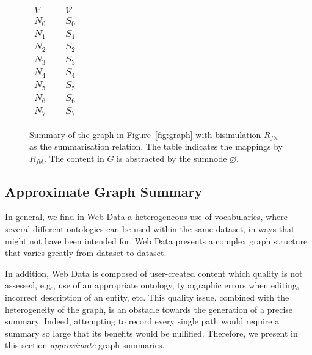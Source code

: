 \begin{figure}
	\centering
	\begin{minipage}{.75\textwidth}
		\resizebox{\textwidth}{!}{
			
		}
	\end{minipage}
	\quad
	\begin{minipage}[h]{.2\textwidth}
		\centering
		\caption*{$R_{fbt}\left(V, \mathcal{V}\right)$}
		\begin{tabular}{lc@{\hs}l}
			\toprule
			$V$ & \phantom{a} & $\mathcal{V}$ \\
			\cmidrule{1-1} \cmidrule{3-3}
			$N_0$ & \phantom{a} & $S_0$ \\
			$N_1$ & \phantom{a} & $S_1$ \\
			$N_2$ & \phantom{a} & $S_2$ \\
			$N_3$ & \phantom{a} & $S_3$ \\
			$N_4$ & \phantom{a} & $S_4$ \\
			$N_5$ & \phantom{a} & $S_5$ \\
			$N_6$ & \phantom{a} & $S_6$ \\
			$N_7$ & \phantom{a} & $S_7$ \\
			\bottomrule
		\end{tabular}
	\end{minipage}
	\caption{Summary of the graph in Figure~\ref{fig:graph} with bisimulation $R_{fbt}$ as the summarisation relation. The table indicates the mappings by $R_{fbt}$. The content in $G$ is abstracted by the sumnode $\varnothing$.}
	\label{fig:fbb-summary}
\end{figure}

\subsection{Approximate Graph Summary}
\label{sec:approximate}

In general, we find in Web Data a heterogeneous use of vocabularies, where several different ontologies can be used within the same dataset, in ways that might not have been intended for. Web Data presents a complex graph structure that varies greatly from dataset to dataset.

In addition, Web Data is composed of user-created content which quality is not assessed, e.g., use of an appropriate ontology, typographic errors when editing, incorrect description of an entity, etc. This quality issue, combined with the heterogeneity of the graph, is an obstacle towards the generation of a precise summary. Indeed, attempting to record every single path would require a summary so large that its benefits would be nullified. Therefore, we present in this section \emph{approximate} graph summaries.

